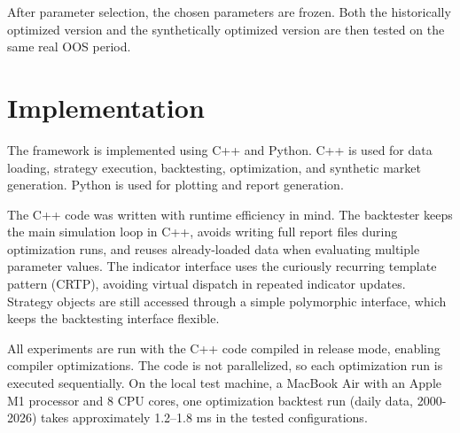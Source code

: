 After parameter selection, the chosen parameters are frozen. Both the historically optimized version
and the synthetically optimized version are then tested on the same real OOS period.

\section{Implementation}

The framework is implemented using C++ and Python. C++ is used for data loading, strategy execution,
backtesting, optimization, and synthetic market generation. Python is used for plotting and report
generation.

The C++ code was written with runtime efficiency in mind. The backtester keeps the main simulation
loop in C++, avoids writing full report files during optimization runs, and reuses already-loaded
data when evaluating multiple parameter values. The indicator interface uses the curiously recurring
template pattern (CRTP), avoiding virtual dispatch in repeated indicator updates. Strategy objects
are still accessed through a simple polymorphic interface, which keeps the backtesting interface
flexible.

All experiments are run with the C++ code compiled in release mode, enabling compiler optimizations.
The code is not parallelized, so each optimization run is executed sequentially. On the local test
machine, a MacBook Air with an Apple M1 processor and 8 CPU cores, one optimization backtest run
(daily data, 2000-2026) takes approximately 1.2--1.8 ms in the tested configurations.
